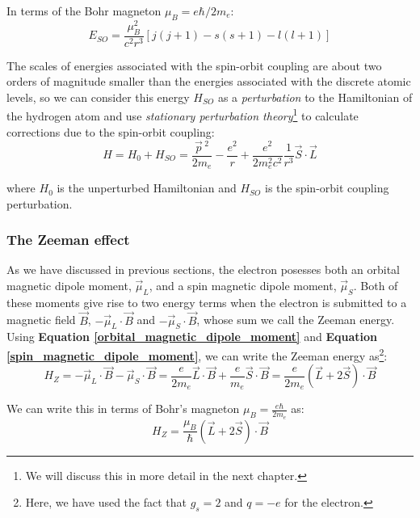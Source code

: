 In terms of the Bohr magneton $\mu_B = e\hbar/2m_e$:
\begin{equation}
    E_{SO} = \frac{\mu_B^2}{c^2r^3} \left[j(j+1)-s(s+1)-l(l+1)\right]
\end{equation}

The scales of energies associated with the spin-orbit coupling are about two orders of magnitude smaller than the energies associated with the discrete atomic levels, so we can consider this energy $H_{SO}$ as a \textit{perturbation} to the Hamiltonian of the hydrogen atom and use \textit{stationary perturbation theory}\footnote{We will discuss this in more detail in the next chapter.} to calculate corrections due to the spin-orbit coupling:
\begin{equation}
    H = H_0 + H_{SO} = \frac{\vec{p}\,^2}{2m_e}-\frac{e^2}{r} + \frac{e^2}{2m_e^2c^2}\frac{1}{r^3}\vec{S}\cdot \vec{L}
\end{equation}

where $H_0$ is the unperturbed Hamiltonian and $H_{SO}$ is the spin-orbit coupling perturbation.

\subsubsection{The Zeeman effect}

As we have discussed in previous sections, the electron posesses both an orbital magnetic dipole moment, $\vec{\mu}_L$, and a spin magnetic dipole moment, $\vec{\mu}_S$. Both of these moments give rise to two energy terms when the electron is submitted to a magnetic field $\vec{B}$, $-\vec{\mu}_L\cdot \vec{B}$ and $-\vec{\mu}_S\cdot \vec{B}$, whose sum we call the Zeeman energy. Using \textbf{Equation \ref{orbital_magnetic_dipole_moment}} and \textbf{Equation \ref{spin_magnetic_dipole_moment}}, we can write the Zeeman energy as\footnote{Here, we have used the fact that $g_s = 2$ and $q=-e$ for the electron.}:
\begin{equation}
    H_Z = -\vec{\mu}_L\cdot \vec{B} - \vec{\mu}_S\cdot \vec{B} = \frac{e}{2m_e}\vec{L}\cdot \vec{B} + \frac{e}{m_e}\vec{S}\cdot \vec{B} = \frac{e}{2m_e}\left(\vec{L}+2\vec{S}\right)\cdot \vec{B}
\end{equation}

We can write this in terms of Bohr's magneton $\mu_B = \frac{e\hbar}{2m_e}$ as:
\begin{equation}
    H_Z = \frac{\mu_B }{\hbar}\left(\vec{L}+2\vec{S}\right)\cdot \vec{B}
\end{equation}

